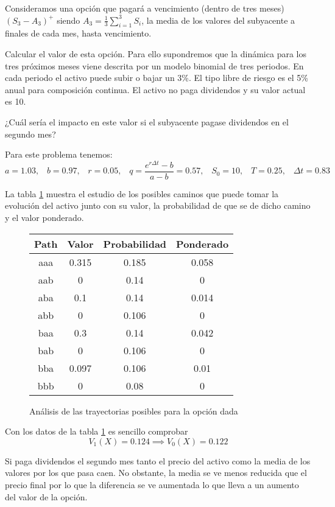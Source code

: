 \begin{problem}[1]
Consideramos una opción que pagará a vencimiento (dentro de tres meses) $(S_3-A_3)^+$ siendo $A_3=\frac{1}{3}\sum_{i=1}^3S_i$, la media de los valores del subyacente a finales de cada mes, hasta vencimiento.

\ppart Calcular el valor de esta opción. Para ello supondremos que la dinámica para los tres próximos meses viene descrita por un modelo binomial de tres periodos. En cada periodo el activo puede subir o bajar un 3\%. El tipo libre de riesgo es el 5\% anual para composición continua. El activo no paga dividendos y su valor actual es 10.

\ppart ¿Cuál sería el impacto en este valor si el subyacente pagase dividendos en el segundo mes?

\solution


\spart
Para este problema tenemos:
\[a=1.03, \;\;\; b=0.97, \;\;\; r = 0.05, \;\;\; q=\frac{e^{rΔt}-b}{a-b}=0.57, \;\;\; S_0 = 10, \;\;\; T = 0.25, \;\;\; Δt = 0.83\]

La tabla \ref{tabla:Junio2015_1} muestra el estudio de los posibles caminos que puede tomar la evolución del activo junto con su valor, la probabilidad de que se de dicho camino y el valor ponderado.

\begin{figure}[hbpt]
\centering
\begin{tabular}{|c|c|c|c|}
\hline
\textbf{Path} & \textbf{Valor} & \textbf{Probabilidad} & \textbf{Ponderado}\\
\hline
aaa & 0.315 & 0.185 & 0.058 \\
aab & 0     & 0.14  & 0 \\
aba & 0.1   & 0.14  & 0.014 \\
abb & 0     & 0.106 & 0 \\
baa & 0.3   & 0.14  & 0.042 \\
bab & 0     & 0.106 & 0 \\
bba & 0.097 & 0.106 & 0.01 \\
bbb & 0     & 0.08  & 0 \\
\hline
\end{tabular}
\caption{Análisis de las trayectorias posibles para la opción dada}
\label{tabla:Junio2015_1}
\end{figure}

Con los datos de la tabla \ref{tabla:Junio2015_1} es sencillo comprobar
\[V_1(X) = 0.124 \implies V_0(X) = 0.122\]

\spart

Si paga dividendos el segundo mes tanto el precio del activo como la media de los valores por los que pasa caen. No obstante, la media se ve menos reducida que el precio final por lo que la diferencia se ve aumentada lo que lleva a un aumento del valor de la opción.
\end{problem}

